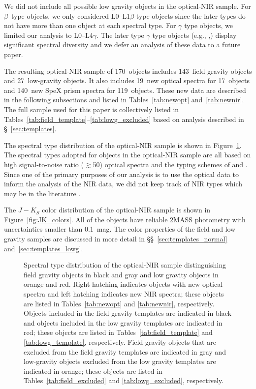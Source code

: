 \documentclass[12pt]{aastex6}
\newcommand{\sample}{170}
\newcommand{\optField}{143}
\newcommand{\optLowG}{27}
\newcommand{\NewOptSpectra}{19} %
\newcommand{\NewOptObjects}{17} %
\newcommand{\NewPrismSpectra}{140} %
\newcommand{\NewPrismObjects}{119} %
\begin{document}
We did not include all possible low gravity objects in the optical-NIR sample.
For $\beta$~type objects, we only considered L0--L1$\beta$-type objects since the later types do not have more than one object at each spectral type.
For $\gamma$ type objects, we limited our analysis to L0--L4$\gamma$.
The later type $\gamma$ type objects (e.g., ,\citet{Cruz09_lowg}) display significant spectral diversity and we defer an analysis of these data to a future paper.

The resulting optical-NIR sample of \sample~objects includes \optField~field gravity objects and \optLowG~low-gravity objects.
It also includes \NewOptSpectra~new optical spectra for \NewOptObjects~objects and \NewPrismSpectra~new SpeX prism spectra for \NewPrismObjects~objects.
These new data are described in the following subsections and listed in Tables~\ref{tab:newopt} and~\ref{tab:newnir}. The full sample used for this paper is collectively listed in Tables~\ref{tab:field_template}--\ref{tab:lowg_excluded} based on analysis described in \S~\ref{sec:templates}.

The spectral type distribution of the optical-NIR sample is shown in Figure~\ref{fig:spthist}.
The spectral types adopted for objects in the optical-NIR sample are all based on high signal-to-noise ratio ($\gtrsim$50) optical spectra and the typing schemes of \cite{K99} and \cite{Cruz09_lowg}.
Since one of the primary purposes of our analysis is to use the optical data to inform the analysis of the NIR data, we did not keep track of NIR types which may be in the literature \citep[e.g.,][]{Geballe02, Allers:2013hk, Marocco:2013kv, Gagne:2015to}.

The $J-K_S$ color distribution of the optical-NIR sample is shown in Figure~\ref{fig:JK_colors}.
All of the objects have reliable 2MASS photometry with uncertainties smaller than 0.1~mag.
The color properties of the field and low gravity samples are discussed in more detail in \S\S~\ref{sec:templates_normal} and~\ref{sec:templates_lowg}.

\begin{figure}
    \caption{Spectral type distribution of the optical-NIR sample distinguishing field gravity objects in black and gray and low gravity objects in orange and red.
    Right hatching indicates objects with new optical spectra and left hatching indicates new NIR spectra; these objects are listed in Tables~\ref{tab:newopt} and \ref{tab:newnir}, respectively.
    Objects included in the field gravity templates are indicated in black and objects included in the low gravity templates are indicated in red; these objects are listed in Tables~\ref{tab:field_template} and \ref{tab:lowg_template}, respectively.
    Field gravity objects that are excluded from the field gravity templates are indicated in gray and low-gravity objects excluded from the low gravity templates are indicated in orange; these objects are listed in Tables~\ref{tab:field_excluded} and \ref{tab:lowg_excluded}, respectively.}
  \label{fig:spthist}
\end{figure}
\end{document}
